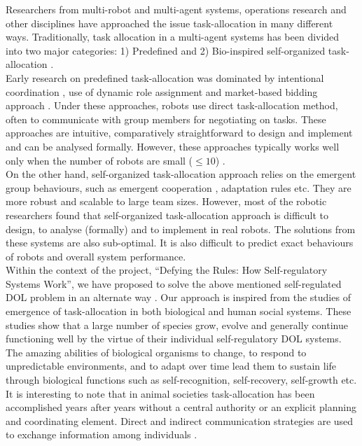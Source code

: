 Researchers from multi-robot and multi-agent systems, operations research and other disciplines have approached the issue task-allocation in many different ways. Traditionally, task allocation in a multi-agent systems has been divided into two major categories: 1) Predefined and 2) Bio-inspired self-organized task-allocation \cite{Shen+2001}.\\
Early research on predefined task-allocation was dominated by intentional coordination \cite{Parker2008}, use of dynamic role assignment \cite{Chaimowicz2002} and market-based bidding approach \cite{Dias+2006}. Under these approaches, robots use direct task-allocation method, often to communicate with group members for negotiating on tasks. These approaches are intuitive, comparatively straightforward to design and implement and can be analysed formally. However, these approaches typically works well only when the number of robots are small ($\leq 10$) \cite{Lerman+2006}.\\
On the other hand, self-organized task-allocation approach relies on the emergent group behaviours, such as emergent cooperation , adaptation rules  etc. They are more robust and scalable to large team sizes. However, most of the robotic researchers found that self-organized task-allocation approach is difficult to design, to analyse (formally) and to implement in real robots. The solutions from these systems are also sub-optimal. It is also difficult to predict exact behaviours of robots and overall system performance.\\
Within the context of the  project, ``Defying the Rules: How Self-regulatory Systems Work'', we have proposed to solve the above mentioned self-regulated DOL problem in an alternate way \cite{Arcaute+2008}. Our approach is inspired from the studies of emergence of task-allocation in both biological and human social systems. These studies show that a large number of species grow, evolve and generally continue functioning well by the virtue of their individual self-regulatory DOL systems.\\
The amazing abilities of biological organisms to change, to respond to unpredictable environments, and to adapt over time lead them to sustain life through biological functions such as self-recognition, self-recovery, self-growth etc. It is interesting to note that in animal societies task-allocation has been accomplished years after years without a central authority or an explicit planning and coordinating element. Direct and indirect communication strategies are used to exchange information among individuals \cite{Camazine+2001}.\\
